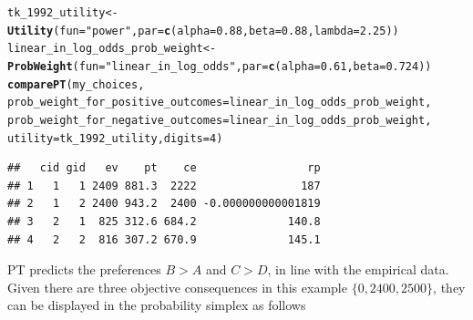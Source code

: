 \documentclass{article}\usepackage[]{graphicx}\usepackage[]{color}
\makeatletter
\newcommand{\hlnum}[1]{\textcolor[rgb]{0.686,0.059,0.569}{#1}}%
\newcommand{\hlstr}[1]{\textcolor[rgb]{0.192,0.494,0.8}{#1}}%
\newcommand{\hlstd}[1]{\textcolor[rgb]{0.345,0.345,0.345}{#1}}%
\newcommand{\hlkwb}[1]{\textcolor[rgb]{0.69,0.353,0.396}{#1}}%
\newcommand{\hlkwc}[1]{\textcolor[rgb]{0.333,0.667,0.333}{#1}}%
\newcommand{\hlkwd}[1]{\textcolor[rgb]{0.737,0.353,0.396}{\textbf{#1}}}%
\newenvironment{kframe}{%
 \def\at@end@of@kframe{}%
 \ifinner\ifhmode%
  \def\at@end@of@kframe{\end{minipage}}%
  \begin{minipage}{\columnwidth}%
 \fi\fi%
 \def\FrameCommand##1{\hskip\@totalleftmargin \hskip-\fboxsep
 \colorbox{shadecolor}{##1}\hskip-\fboxsep
     \hskip-\linewidth \hskip-\@totalleftmargin \hskip\columnwidth}%
 \MakeFramed {\advance\hsize-\width
   \@totalleftmargin\z@ \linewidth\hsize
   \@setminipage}}%
 {\par\unskip\endMakeFramed%
 \at@end@of@kframe}
\newenvironment{knitrout}{}{} %
\makeatother
\begin{document}
\begin{knitrout}
\color{fgcolor}\begin{kframe}
\begin{alltt}
\hlstd{tk_1992_utility} \hlkwb{<-} \hlkwd{Utility}\hlstd{(}\hlkwc{fun}\hlstd{=}\hlstr{"power"}\hlstd{,} \hlkwc{par}\hlstd{=}\hlkwd{c}\hlstd{(}\hlkwc{alpha}\hlstd{=}\hlnum{0.88}\hlstd{,} \hlkwc{beta}\hlstd{=}\hlnum{0.88}\hlstd{,} \hlkwc{lambda}\hlstd{=}\hlnum{2.25}\hlstd{))}
\hlstd{linear_in_log_odds_prob_weight} \hlkwb{<-} \hlkwd{ProbWeight}\hlstd{(}\hlkwc{fun}\hlstd{=}\hlstr{"linear_in_log_odds"}\hlstd{,} \hlkwc{par}\hlstd{=}\hlkwd{c}\hlstd{(}\hlkwc{alpha}\hlstd{=}\hlnum{0.61}\hlstd{,} \hlkwc{beta}\hlstd{=}\hlnum{0.724}\hlstd{))}
\hlkwd{comparePT}\hlstd{(my_choices,}
        \hlkwc{prob_weight_for_positive_outcomes}\hlstd{=linear_in_log_odds_prob_weight,}
        \hlkwc{prob_weight_for_negative_outcomes}\hlstd{=linear_in_log_odds_prob_weight,}
        \hlkwc{utility}\hlstd{=tk_1992_utility,} \hlkwc{digits}\hlstd{=}\hlnum{4}\hlstd{)}
\end{alltt}
\begin{verbatim}
##   cid gid   ev    pt    ce                 rp
## 1   1   1 2409 881.3  2222                187
## 2   1   2 2400 943.2  2400 -0.000000000001819
## 3   2   1  825 312.6 684.2              140.8
## 4   2   2  816 307.2 670.9              145.1
\end{verbatim}
\end{kframe}
\end{knitrout}


PT predicts the preferences $B > A$ and $C > D$, in line with the empirical data.
Given there are three objective consequences in this example $\{0, 2400, 2500\}$, they can be displayed in the probability simplex \citep*{Marschak_1950, Machina_1987} as follows
\end{document}
